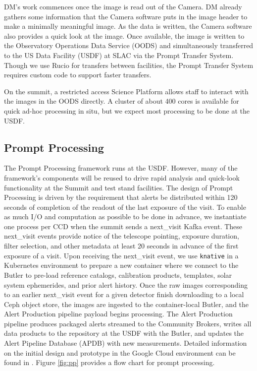 \documentclass[11pt,twoside]{article}
\begin{document}
\begin{centering}
\end{centering}

DM's work commences once the image is read out of the Camera. DM already gathers some information that the Camera software puts in the image header to make a minimally meaningful image.
As the data is written, the Camera software also provides a quick look at the image.
Once available, the image is written to the Observatory Operations Data Service (OODS) and simultaneously transferred to the US Data Facility (USDF) at SLAC via the Prompt Transfer System. Though we use Rucio for transfers between facilities, the Prompt Transfer System requires custom code to support faster transfers.

On the summit, a restricted access Science Platform allows staff to interact with the images in the OODS directly.
A cluster of about 400 cores is available for quick ad-hoc processing in situ, but we expect most processing to be done at the USDF.

\subsection{Prompt Processing} \label{sec:prompt}
The Prompt Processing framework runs at the USDF. However, many of the framework's components will be reused to drive rapid analysis and quick-look functionality at the Summit and test stand facilities.
The design of Prompt Processing is driven by the requirement that alerts be distributed within 120 seconds of completion of the readout of the last exposure of the visit.
To enable as much I/O and computation as possible to be done in advance, we instantiate one process per CCD when the summit sends a next\_visit Kafka event.
These next\_visit events provide notice of the telescope pointing, exposure duration, filter selection, and other metadata at least 20 seconds in advance of the first exposure of a visit.
Upon receiving the next\_visit event, we use \texttt{knative} in a Kubernetes environment to prepare a new container where we connect to the Butler to pre-load reference catalogs, calibration products, templates, solar system ephemerides, and prior alert history.
Once the raw images corresponding to an earlier next\_visit event for a given detector finish downloading to a local Ceph object store, the images are ingested to the container-local Butler, and the Alert Production pipeline payload begins processing.
The Alert Production pipeline produces packaged alerts streamed to the Community Brokers, writes all data products to the repository at the USDF with the Butler, and updates the Alert Pipeline Database (APDB) with new measurements.
Detailed information on the initial design and prototype in the Google Cloud environment can be found in \citet{DMTN-219}.
Figure \ref{fig:pp} provides a flow chart for prompt processing.
\end{document}
